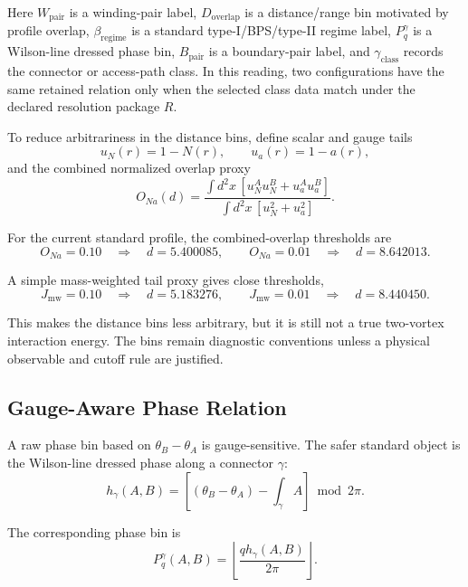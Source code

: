 \documentclass[11pt,a4paper]{article}
\begin{document}
Here $W_{\mathrm{pair}}$ is a winding-pair label, $D_{\mathrm{overlap}}$ is a distance/range bin motivated by profile overlap, $\beta_{\mathrm{regime}}$ is a standard type-I/BPS/type-II regime label, $P_q^\gamma$ is a Wilson-line dressed phase bin, $B_{\mathrm{pair}}$ is a boundary-pair label, and $\gamma_{\mathrm{class}}$ records the connector or access-path class. In this reading, two configurations have the same retained relation only when the selected class data match under the declared resolution package $R$.

To reduce arbitrariness in the distance bins, define scalar and gauge tails
\begin{equation}
u_N(r)=1-N(r),
\qquad
u_a(r)=1-a(r),
\end{equation}
and the combined normalized overlap proxy
\begin{equation}
O_{Na}(d)=
\frac{\int d^2x\,[u_N^A u_N^B+u_a^A u_a^B]}
{\int d^2x\,[u_N^2+u_a^2]}.
\end{equation}

For the current standard profile, the combined-overlap thresholds are
\begin{equation}
O_{Na}=0.10 \quad\Rightarrow\quad d=5.400085,
\qquad
O_{Na}=0.01 \quad\Rightarrow\quad d=8.642013.
\end{equation}

A simple mass-weighted tail proxy gives close thresholds,
\begin{equation}
J_{\mathrm{mw}}=0.10 \quad\Rightarrow\quad d=5.183276,
\qquad
J_{\mathrm{mw}}=0.01 \quad\Rightarrow\quad d=8.440450.
\end{equation}

This makes the distance bins less arbitrary, but it is still not a true two-vortex interaction energy. The bins remain diagnostic conventions unless a physical observable and cutoff rule are justified.

\subsection{Gauge-Aware Phase Relation}

A raw phase bin based on $\theta_B-\theta_A$ is gauge-sensitive. The safer standard object is the Wilson-line dressed phase along a connector $\gamma$:
\begin{equation}
h_\gamma(A,B)
=\left[(\theta_B-\theta_A)-\int_\gamma A\right]\bmod 2\pi.
\end{equation}

The corresponding phase bin is
\begin{equation}
P_q^\gamma(A,B)
=\left\lfloor \frac{q h_\gamma(A,B)}{2\pi}\right\rfloor.
\end{equation}
\end{document}
